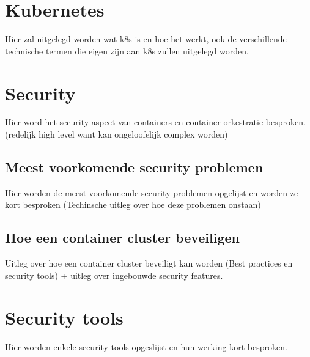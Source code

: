 \section{Kubernetes}
Hier zal uitgelegd worden wat k8s is en hoe het werkt, ook de verschillende technische termen die eigen zijn aan k8s zullen uitgelegd worden.

\section{Security}
Hier word het security aspect van containers en container orkestratie besproken. (redelijk high level want kan ongeloofelijk complex worden)

\subsection{Meest voorkomende security problemen}
Hier worden de meest voorkomende security problemen opgelijst en worden ze kort besproken (Techinsche uitleg over hoe deze problemen onstaan)

\subsection{Hoe een container cluster beveiligen}
Uitleg over hoe een container cluster beveiligt kan worden (Best practices en security tools) + uitleg over ingebouwde security features.

\section{Security tools}
Hier worden enkele security tools opgeslijst en hun werking kort besproken.